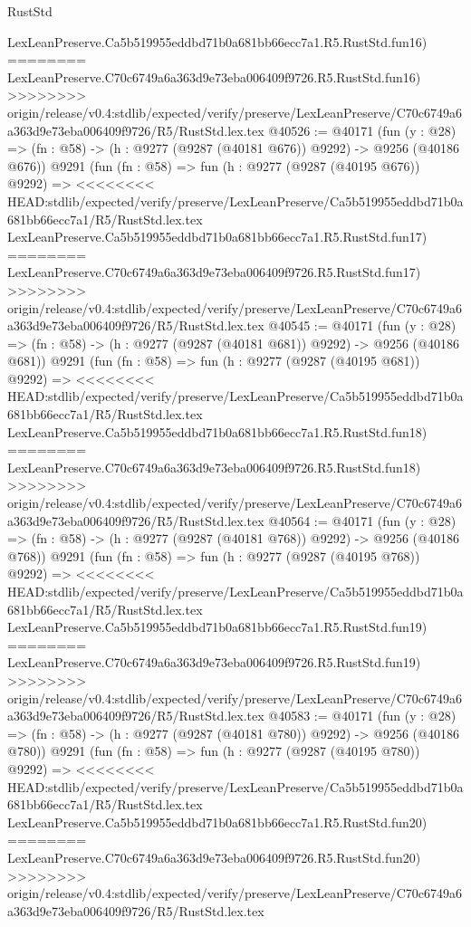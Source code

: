 \begin{lexlean}{RustStd}
\begin{coremodule}
{\begin{coremodule}
{{{{{{{{{{{{{{{{{{{{{{{{{{{{{{{{{{{{{{{{{{{{{{{{{{{{{{{    LexLeanPreserve.Ca5b519955eddbd71b0a681bb66ecc7a1.R5.RustStd.fun16)
========
    LexLeanPreserve.C70c6749a6a363d9e73eba006409f9726.R5.RustStd.fun16)
>>>>>>>> origin/release/v0.4:stdlib/expected/verify/preserve/LexLeanPreserve/C70c6749a6a363d9e73eba006409f9726/R5/RustStd.lex.tex
@40526 := @40171
    (fun (y : @28) => (fn : @58) -> (h : @9277 (@9287 (@40181 @676)) @9292) -> @9256 (@40186 @676))
    @9291
    (fun (fn : @58) =>
    fun (h : @9277 (@9287 (@40195 @676)) @9292) =>
<<<<<<<< HEAD:stdlib/expected/verify/preserve/LexLeanPreserve/Ca5b519955eddbd71b0a681bb66ecc7a1/R5/RustStd.lex.tex
    LexLeanPreserve.Ca5b519955eddbd71b0a681bb66ecc7a1.R5.RustStd.fun17)
========
    LexLeanPreserve.C70c6749a6a363d9e73eba006409f9726.R5.RustStd.fun17)
>>>>>>>> origin/release/v0.4:stdlib/expected/verify/preserve/LexLeanPreserve/C70c6749a6a363d9e73eba006409f9726/R5/RustStd.lex.tex
@40545 := @40171
    (fun (y : @28) => (fn : @58) -> (h : @9277 (@9287 (@40181 @681)) @9292) -> @9256 (@40186 @681))
    @9291
    (fun (fn : @58) =>
    fun (h : @9277 (@9287 (@40195 @681)) @9292) =>
<<<<<<<< HEAD:stdlib/expected/verify/preserve/LexLeanPreserve/Ca5b519955eddbd71b0a681bb66ecc7a1/R5/RustStd.lex.tex
    LexLeanPreserve.Ca5b519955eddbd71b0a681bb66ecc7a1.R5.RustStd.fun18)
========
    LexLeanPreserve.C70c6749a6a363d9e73eba006409f9726.R5.RustStd.fun18)
>>>>>>>> origin/release/v0.4:stdlib/expected/verify/preserve/LexLeanPreserve/C70c6749a6a363d9e73eba006409f9726/R5/RustStd.lex.tex
@40564 := @40171
    (fun (y : @28) => (fn : @58) -> (h : @9277 (@9287 (@40181 @768)) @9292) -> @9256 (@40186 @768))
    @9291
    (fun (fn : @58) =>
    fun (h : @9277 (@9287 (@40195 @768)) @9292) =>
<<<<<<<< HEAD:stdlib/expected/verify/preserve/LexLeanPreserve/Ca5b519955eddbd71b0a681bb66ecc7a1/R5/RustStd.lex.tex
    LexLeanPreserve.Ca5b519955eddbd71b0a681bb66ecc7a1.R5.RustStd.fun19)
========
    LexLeanPreserve.C70c6749a6a363d9e73eba006409f9726.R5.RustStd.fun19)
>>>>>>>> origin/release/v0.4:stdlib/expected/verify/preserve/LexLeanPreserve/C70c6749a6a363d9e73eba006409f9726/R5/RustStd.lex.tex
@40583 := @40171
    (fun (y : @28) => (fn : @58) -> (h : @9277 (@9287 (@40181 @780)) @9292) -> @9256 (@40186 @780))
    @9291
    (fun (fn : @58) =>
    fun (h : @9277 (@9287 (@40195 @780)) @9292) =>
<<<<<<<< HEAD:stdlib/expected/verify/preserve/LexLeanPreserve/Ca5b519955eddbd71b0a681bb66ecc7a1/R5/RustStd.lex.tex
    LexLeanPreserve.Ca5b519955eddbd71b0a681bb66ecc7a1.R5.RustStd.fun20)
========
    LexLeanPreserve.C70c6749a6a363d9e73eba006409f9726.R5.RustStd.fun20)
>>>>>>>> origin/release/v0.4:stdlib/expected/verify/preserve/LexLeanPreserve/C70c6749a6a363d9e73eba006409f9726/R5/RustStd.lex.tex
}}}}}}}}}}}}}}}}}}}}}}}}}}}}}}}}}}}}}}}}}}}}}}}}}}}}}}}
\end{coremodule}}
\end{coremodule}
\end{lexlean}
